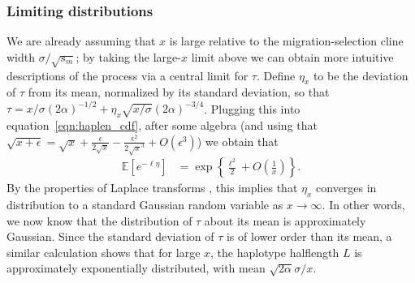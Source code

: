 \documentclass{article}
\newcommand{\E}{\mathbb{E}}
\begin{document}
\subsubsection{Limiting distributions}

We are already assuming that $x$ is large relative to the migration-selection cline width $\sigma/\sqrt{s_m}$;
by taking the large-$x$ limit above we can obtain more intuitive descriptions of the process
via a central limit for $\tau$.
Define $\eta_x$ to be the deviation of $\tau$ from its mean, normalized by its standard deviation,
so that $\tau = x/\sigma(2\alpha)^{-1/2} + \eta_x \sqrt{x/\sigma} (2\alpha)^{-3/4}$.
Plugging this into equation~\eqref{eqn:haplen_cdf},
after some algebra (and using that $\sqrt{x+\epsilon} = \sqrt{x} + \frac{\epsilon}{2\sqrt{x}} - \frac{\epsilon^2}{2\sqrt{x}^3} + O(\epsilon^3)$) we obtain that
\begin{align}
  \E[e^{-\ell \eta}] &= \exp\left\{ \frac{\ell^2}{2} + O\left(\frac{1}{x}\right) \right\}.
\end{align}
By the properties of Laplace transforms \citep{durrett},
this implies that $\eta_x$ converges in distribution to a standard Gaussian random variable as $x \to \infty$.
In other words, we now know that the distribution of $\tau$ about its mean is approximately Gaussian.
Since the standard deviation of $\tau$ is of lower order than its mean,
a similar calculation shows that for large $x$, the haplotype halflength $L$ is approximately exponentially distributed, 
with mean $\sqrt{2\alpha} \sigma/x$.



\end{document}
